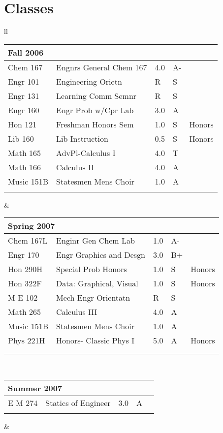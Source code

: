 \documentclass[oneside]{article}
\newcommand{\semtable}[1]{
  \begin{tabular}{p{1.5cm} p{3.5cm} p{.3cm} p{.3cm} p{0.75cm}}
    \multicolumn{5}{l}{#1}\\
    \hline
}
\newcommand{\semtableend}{
  \\
  \end{tabular}
}
\begin{document}
\section{Classes}

{\footnotesize

  \begin{tabular}{ll}
  
    
    \semtable{Fall 2006}
      Chem 167 & Engnrs General Chem 167 & 4.0 & A- & \\
      Engr 101 & Engineering Orietn  & R & S &\\
      Engr 131 & Learning Comm Semnr & R & S &\\
      Engr 160 & Engr Prob w/Cpr Lab & 3.0 & A &\\
      Hon 121 & Freshman Honors Sem & 1.0 & S & Honors\\
      Lib 160 & Lib Instruction  & 0.5 & S & Honors\\
      Math 165 & AdvPl-Calculus I & 4.0 & T &\\
      Math 166 & Calculus II & 4.0 & A &\\
      Music 151B  & Statesmen Mens Choir & 1.0 & A &\\ 
    \semtableend
    &
    \semtable{Spring 2007}
      Chem 167L & Enginr Gen Chem Lab & 1.0  & A- &\\
      Engr 170 & Engr Graphics and Desgn & 3.0 & B+ &\\
      Hon 290H & Special Prob Honors & 1.0 & S & Honors\\
      Hon 322F & Data: Graphical, Visual & 1.0 & S & Honors\\
      M E 102 & Mech Engr Orientatn & R & S &\\
      Math 265 & Calculus III & 4.0 & A &\\
      Music 151B & Statesmen Mens Choir & 1.0 & A &\\
      Phys 221H & Honors- Classic Phys I & 5.0 & A & Honors\\
      \\
    \semtableend
    \\
    
    \semtable{Summer 2007}
      E M 274 & Statics of Engineer & 3.0 & A &\\
    \semtableend
    & 
    \\
    

\end{tabular}}
\end{document}
